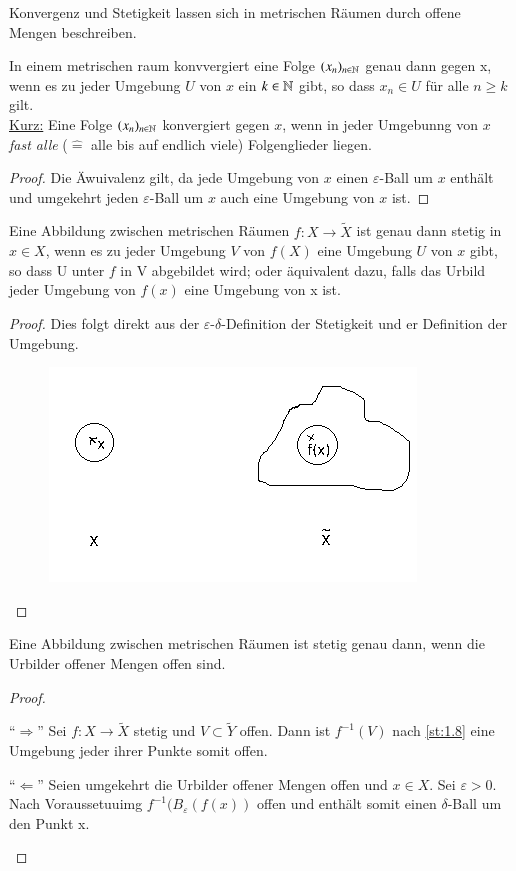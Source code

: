 \documentclass[a4paper,10pt]{scrartcl}
\newcommand{\eps}{\varepsilon}
\begin{document}
Konvergenz und Stetigkeit lassen sich in metrischen Räumen durch offene Mengen beschreiben.
\begin{st}
In einem metrischen raum konvvergiert eine Folge $(x_n)_{n \in \mathbb{N}}$ genau dann gegen x, wenn es zu jeder Umgebung $U$ von $x$ ein $k \in \mathbb{N}$ gibt, so dass $x_n \in U$ für alle $n \ge k $ gilt.\\
\underline{Kurz:} Eine Folge $(x_n)_{n \in \mathbb{N}}$ konvergiert gegen $x$, wenn in jeder Umgebunng von $x$ \emph{fast alle} ($\hat =$ alle bis auf endlich viele) Folgenglieder liegen.
\end{st}
\begin{proof}
Die Äwuivalenz gilt, da jede Umgebung von $x$ einen $\eps$-Ball um $x$ enthält und umgekehrt jeden $\eps$-Ball um $x$ auch eine Umgebung von $x$ ist.
\end{proof}
\begin{st}\label{st:1.8}
Eine Abbildung zwischen metrischen Räumen $f: X\rightarrow \tilde X$ ist genau dann stetig in $x \in X$, wenn es zu jeder Umgebung $V$ von $f(X)$ eine Umgebung $U$ von $x$ gibt, so dass U unter $ f $ in V abgebildet wird; oder äquivalent dazu, falls das Urbild jeder Umgebung von $  f(x) $ eine Umgebung von x ist.
\end{st}
\begin{proof}
Dies folgt direkt aus der $ \eps $-$ \delta $-Definition der Stetigkeit und er Definition der Umgebung.
\begin{figure}[h]

\includegraphics[scale=0.5]{fig4.png}
\end{figure}
\end{proof}
\begin{st}
Eine Abbildung zwischen metrischen Räumen ist stetig genau dann, wenn die Urbilder offener Mengen offen sind.
\end{st}
\begin{proof}
\begin{seg}{"`$\Longrightarrow$"'}
Sei $ f: X \to \tilde X $ stetig und $ V \subset \tilde Y $ offen.  Dann ist $ f^{-1}(V) $ nach \ref{st:1.8} eine Umgebung jeder ihrer Punkte somit offen.
\end{seg}
\begin{seg}{"`$\Longleftarrow$"'}
Seien umgekehrt die Urbilder offener Mengen offen und $ x \in X $. Sei $ \eps>0 $.  Nach Voraussetuuimg $ f^{-1}(B_\eps(f(x)) $ offen und enthält somit einen $ \delta $-Ball um den Punkt x.
\end{seg}
\end{proof}
\end{document}
